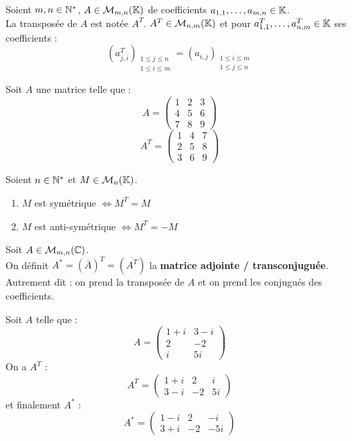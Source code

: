 \begin{definition}[Transposée]
	Soient $m, n \in \mathbb{N}^*$, $A \in \mathcal{M}_{m, n}(\mathbb{K})$ de coefficients $a_{1,1}, \ldots, a_{m,n} \in \mathbb{K}$.
	\\
	La transposée de $A$ est notée $A^T$. $A^T \in \mathcal{M}_{n,m}(\mathbb{K})$ et pour $a^T_{1,1}, \ldots, a^T_{n,m} \in \mathbb{K}$ ses coefficients :
	\[ (a^T_{j,i})_{\substack{1 \leq j \leq n \\ 1 \leq i \leq m}} = (a_{i,j})_{\substack{1 \leq i \leq m \\ 1 \leq j \leq n}} \]
\end{definition}

\begin{example}
	Soit $A$ une matrice telle que :
	\[ 
	A = 
	\begin{pmatrix}
	1 & 2 & 3 \\
	4 & 5 & 6 \\
	7 & 8 & 9
	\end{pmatrix}
	\]
	\[
	A^T =
	\begin{pmatrix}
	1 & 4 & 7 \\
	2 & 5 & 8 \\
	3 & 6 & 9
	\end{pmatrix}
	\]
\end{example}

\begin{definition}
	Soient $n \in \mathbb{N}^*$ et $M \in \mathcal{M}_n(\mathbb{K})$.
	    \begin{enumerate}
    		\item $M$ est symétrique $\iff M^T = M$
    		\item $M$ est anti-symétrique $\iff M^T = -M$
    	\end{enumerate}
\end{definition}

\begin{definition}
	Soit $A \in \mathcal{M}_{m,n}(\mathbb{C})$.
	\\
	On définit $A^* = (\overline{A})^T = (\overline{A^T})$ la \textbf{matrice adjointe / transconjuguée}.
	Autrement dit : on prend la transposée de $A$ et on prend les conjugués des coefficients.
\end{definition}

\begin{example}
	Soit $A$ telle que :
	\[ A =
	\begin{pmatrix}
		1 + i & 3 - i \\
		2 & -2 \\
		i & 5i
	\end{pmatrix}
	\]
	On a $A^T$ :
	\[ 
	A^T = 
	\begin{pmatrix}
		1 + i  & 2 & i \\
		3 - i & -2 & 5i
	\end{pmatrix}
	\]
	et finalement $A^*$ :
	\[
	A^* =
	\begin{pmatrix}
		1 - i & 2 & -i \\
		3 + i & -2 & -5i
	\end{pmatrix}
	\]
\end{example}

